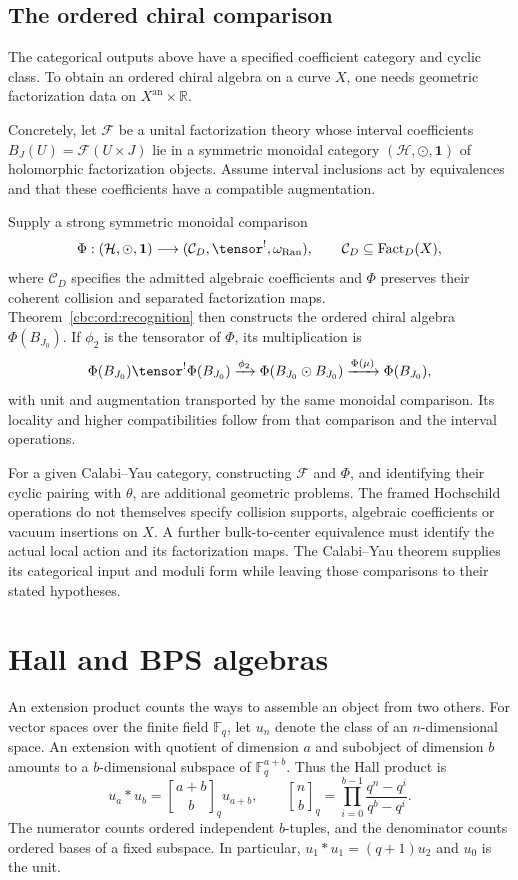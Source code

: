 \section{The ordered chiral comparison}

The categorical outputs above have a specified coefficient category and cyclic class.
To obtain an ordered chiral algebra on a curve $X$, one needs geometric factorization data on $X^{\mathrm{an}}\times\mathbb R$.

Concretely, let $\mathcal F$ be a unital factorization theory whose interval coefficients
$B_J(U)=\mathcal F(U\times J)$ lie in a symmetric monoidal category $(\mathcal H,\odot,\mathbf1)$ of holomorphic factorization objects.
Assume interval inclusions act by equivalences and that these coefficients have a compatible augmentation.

Supply a strong symmetric monoidal comparison
\[
 \Phi:(\mathcal H,\odot,\mathbf1)
       \longrightarrow
       (\mathcal C_D,\tensor^!,\omega_{\operatorname{Ran}}),
 \qquad \mathcal C_D\subseteq\operatorname{Fact}_D(X),
\]
where $\mathcal C_D$ specifies the admitted algebraic coefficients and $\Phi$ preserves their coherent collision and separated factorization maps.
Theorem~\ref{cbc:ord:recognition} then constructs the ordered chiral algebra $\Phi(B_{J_0})$.
If $\phi_2$ is the tensorator of $\Phi$, its multiplication is
\[
 \Phi(B_{J_0})\tensor^!\Phi(B_{J_0})
   \xrightarrow{\phi_2}\Phi(B_{J_0}\odot B_{J_0})
   \xrightarrow{\Phi(\mu)}\Phi(B_{J_0}),
\]
with unit and augmentation transported by the same monoidal comparison.
Its locality and higher compatibilities follow from that comparison and the interval operations.

For a given Calabi--Yau category, constructing $\mathcal F$ and $\Phi$, and identifying their cyclic pairing with $\theta$, are additional geometric problems.
The framed Hochschild operations do not themselves specify collision supports, algebraic coefficients or vacuum insertions on $X$.
A further bulk-to-center equivalence must identify the actual local action and its factorization maps.
The Calabi--Yau theorem supplies its categorical input and moduli form while leaving those comparisons to their stated hypotheses.

\chapter{Hall and BPS algebras}\label{cbc:hall:chapter}
An extension product counts the ways to assemble an object from two others.
For vector spaces over the finite field $\mathbb F_q$, let $u_n$ denote the class of an $n$-dimensional space.
An extension with quotient of dimension $a$ and subobject of dimension $b$ amounts to a $b$-dimensional subspace of $\mathbb F_q^{a+b}$.
Thus the Hall product is
\begin{equation}\label{cbc:hall:gaussian}
 u_a*u_b={a+b\brack b}_q u_{a+b},
 \qquad
 {n\brack b}_q=
 \prod_{i=0}^{b-1}\frac{q^n-q^i}{q^b-q^i}.
\end{equation}
The numerator counts ordered independent $b$-tuples, and the denominator counts ordered bases of a fixed subspace.
In particular, $u_1*u_1=(q+1)u_2$ and $u_0$ is the unit.

